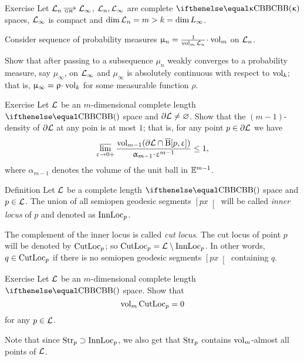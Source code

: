 \begin{thm}{Exercise}
Let $\spc{L}_n\GHto\spc{L}_\infty$,
$\mathcal{L}_n,\mathcal{L}_\infty$ are complete $\Alex\kappa$ spaces,
$\mathcal{L}_\infty$ is compact
and $\mathop{\rm dim}\nolimits\mathcal{L}_n=m>k=\mathop{\rm dim}\nolimits{L}_\infty$.

Consider sequence of probability measures 
$\mu_n=\tfrac{1}{\vol_m\spc{L}_n}\cdot\vol_m$
on $\mathcal{L}_n$.

Show that after passing to a subsequence $\mu_n$ weakly converges to a probability measure, say $\mu_\infty$, on $\mathcal{L}_\infty$ and $\mu_\infty$ is absolutely continuous with respect to $\mathop{\rm vol}\nolimits_k$;
that is, $\mu_\infty=\rho\cdot\vol_\kay$
for some measurable function $\rho$.
\end{thm}








\begin{thm}{Exercise}
Let $\mathcal{L}$ be an $m$-dimensional complete length $\Alex{}$ space and $\partial \mathcal{L}\ne\varnothing$.
Show that the $(m-1)$-density of $\partial \mathcal{L}$ at any poin is at most $1$;
that is, 
for any point $p\in \partial \spc{L}$
we have
\[\limsup_{\eps\to0+}\frac{\vol_{m-1}(\partial\spc{L}\cap\cBall[p,\eps])}{\alpha_{m-1}\cdot \eps^{m-1}}\le 1,\]
where $\alpha_{m-1}$ denotes the volume of the unit ball in $\mathbb{E}^{m-1}$.
\end{thm}


\begin{thm}{Definition}
Let $\mathcal{L}$ be a complete length $\Alex{}$ space and $p\in \spc{L}$.
The union of all semiopen geodesic segments $\left[px\right[$
will be called \emph{inner locus} of $p$ 
and denoted as $\mathop{\rm InnLoc}\nolimits_p$.

The complement of the inner locus
is called 
\emph{cut locus}.
The cut locus of point $p$ will be denoted by $\mathop{\rm CutLoc}\nolimits_p$;
so $\mathop{\rm CutLoc}\nolimits_p=\mathcal{L}\setminus\mathop{\rm InnLoc}\nolimits_p$.
In other words, $q\in \CutLoc_p$ if there is no semiopen geodesic segments $\left[px\right[$ containing $q$. 
\end{thm}


\begin{thm}{Exercise}
Let $\mathcal{L}$ be an $m$-dimensional complete length $\Alex{}$ space.
Show that
\[\mathop{\rm vol}\nolimits_m\mathop{\rm CutLoc}\nolimits_p=0\]
for any $p\in \spc{L}$.
\end{thm}

Note that since $\Str_p\supset \InnLoc_p$,
we also get that $\mathop{\rm Str}\nolimits_p$ contains $\mathop{\rm vol}\nolimits_m$-almost all points of $\mathcal{L}$.

